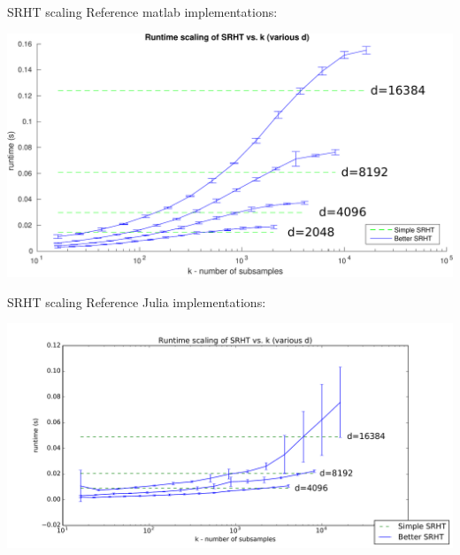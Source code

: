 \documentclass[9pt]{beamer}
\begin{document}
\begin{frame}{SRHT scaling}
    Reference {\sc matlab} implementations:\\

   \begin{center}
      \includegraphics[width=\textwidth]{figures/srht_matlab_ref_k_scaling_trim.pdf}
   \end{center}
\end{frame}

\begin{frame}{SRHT scaling}
    Reference Julia implementations:\\

   \begin{center}
      \includegraphics[width=\textwidth]{figures/srht_julia_ref_k_scaling.pdf}
   \end{center}
\end{frame}
\end{document}
